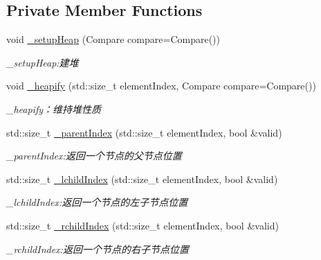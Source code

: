 \subsection*{Private Member Functions}
\begin{DoxyCompactItemize}
\item 
void \hyperlink{class_introdunction_to_algorithm_1_1_sort_algorithm_1_1_sort___heap_ab8b98e11afa86430214c6998c48b21d1}{\+\_\+setup\+Heap} (Compare compare=Compare())
\begin{DoxyCompactList}\small\item\em \+\_\+setup\+Heap\+:建堆 \end{DoxyCompactList}\item 
void \hyperlink{class_introdunction_to_algorithm_1_1_sort_algorithm_1_1_sort___heap_a12f57e7bb47939f0f4f0994ee81d4b9e}{\+\_\+heapify} (std\+::size\+\_\+t element\+Index, Compare compare=Compare())
\begin{DoxyCompactList}\small\item\em \+\_\+heapify：维持堆性质 \end{DoxyCompactList}\item 
std\+::size\+\_\+t \hyperlink{class_introdunction_to_algorithm_1_1_sort_algorithm_1_1_sort___heap_a2607ad45b37fb4dde8e2c94e50cd19da}{\+\_\+parent\+Index} (std\+::size\+\_\+t element\+Index, bool \&valid)
\begin{DoxyCompactList}\small\item\em \+\_\+parent\+Index\+:返回一个节点的父节点位置 \end{DoxyCompactList}\item 
std\+::size\+\_\+t \hyperlink{class_introdunction_to_algorithm_1_1_sort_algorithm_1_1_sort___heap_a0ba289760dd936944dc2629511c73f27}{\+\_\+lchild\+Index} (std\+::size\+\_\+t element\+Index, bool \&valid)
\begin{DoxyCompactList}\small\item\em \+\_\+lchild\+Index\+:返回一个节点的左子节点位置 \end{DoxyCompactList}\item 
std\+::size\+\_\+t \hyperlink{class_introdunction_to_algorithm_1_1_sort_algorithm_1_1_sort___heap_abb4d45e22fc4fc5ec297214f28605209}{\+\_\+rchild\+Index} (std\+::size\+\_\+t element\+Index, bool \&valid)
\begin{DoxyCompactList}\small\item\em \+\_\+rchild\+Index\+:返回一个节点的右子节点位置 \end{DoxyCompactList}\end{DoxyCompactItemize}

